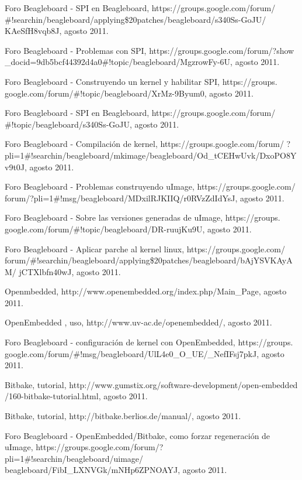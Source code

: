 \begin{thebibliography}{200}
\bibitem{} Foro Beagleboard - SPI en Beagleboard, https://groups.google.com/forum/
\#!searchin/beagleboard/applying\$20patches/beagleboard/s340Ss-GoJU/
KAeSfH8vqb8J, agosto 2011.

\bibitem{} Foro Beagleboard - Problemas con SPI, https://groups.google.com/forum/?show
\_docid=9db5bcf44392d4a0\#!topic/beagleboard/MgzrowFy-6U, agosto 2011.

\bibitem{} Foro Beagleboard - Construyendo un kernel y habilitar SPI, https://groups.
google.com/forum/\#!topic/beagleboard/XrMz-9Byum0, agosto 2011.

\bibitem{} Foro Beagleboard - SPI en Beagleboard, https://groups.google.com/forum/
\#!topic/beagleboard/s340Ss-GoJU, agosto 2011.

\bibitem{} Foro Beagleboard - Compilación de kernel, https://groups.google.com/forum/
?pli=1\#!searchin/beagleboard/mkimage/beagleboard/Od\_tCEHwUvk/DxoPO8Y
v9t0J, agosto 2011.

\bibitem{} Foro Beagleboard - Problemas construyendo uImage, https://groups.google.com/
forum/?pli=1\#!msg/beagleboard/MDxilRJKIIQ/r0RVzZdIdYsJ, agosto 2011.

\bibitem{} Foro Beagleboard - Sobre las versiones generadas de uImage, https://groups.
google.com/forum/\#!topic/beagleboard/DR-ruujKu9U, agosto 2011.

\bibitem{} Foro Beagleboard - Aplicar parche al kernel linux, https://groups.google.com/\\
forum/\#!searchin/beagleboard/applying\$20patches/beagleboard/bAjYSVKAyAM/
jCTXlbfn40wJ, agosto 2011.

\bibitem{} Openmbedded, http://www.openembedded.org/index.php/Main\_Page, agosto 2011.

\bibitem{} OpenEmbedded , uso, http://www.uv-ac.de/openembedded/, agosto 2011.

\bibitem{} Foro Beagleboard - configuración de kernel con OpenEmbedded, https://groups.
google.com/forum/\#!msg/beagleboard/UlL4e0\_O\_UE/\_NefIFsj7pkJ, agosto 2011.

\bibitem{} Bitbake, tutorial, http://www.gumstix.org/software-development/open-embedded
/160-bitbake-tutorial.html, agosto 2011.

\bibitem{} Bitbake, tutorial, http://bitbake.berlios.de/manual/, agosto 2011.

\bibitem{} Foro Beagleboard - OpenEmbedded/Bitbake, como forzar regeneración de \\
uImage, https://groups.google.com/forum/?pli=1\#!searchin/beagleboard/uimage/
beagleboard/FibI\_LXNVGk/mNHp6ZPNOAYJ, agosto 2011.


\end{thebibliography}
